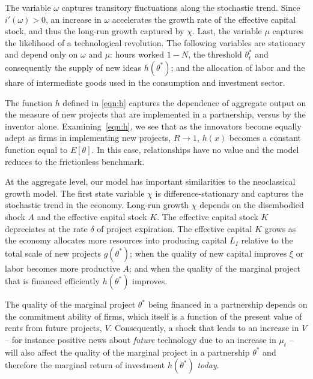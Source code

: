 \documentclass[12pt]{article}
\begin{document}
The variable $\omega$ captures transitory fluctuations along the stochastic trend. Since $i'(\omega)>0$, an increase in $\omega$ accelerates the growth rate of the effective capital stock, and thus the long-run growth captured by $\chi$.
Last, the variable $\mu$ captures the likelihood of a technological revolution. The following variables are stationary and depend only on $\omega$ and $\mu$: hours worked $1-N$, the threshold $\theta_t^*$ and consequently the supply of new ideas $h(\theta^*)$; and the allocation of labor and the share of intermediate goods used in the consumption and investment sector.


The function $h$ defined in \eqref{eqn:h} captures the dependence of aggregate output on the measure of new projects that are implemented in a partnership, versus by the inventor alone. Examining~\eqref{eqn:h}, we see that as the innovators become equally adept as firms in implementing new projects, $R\rightarrow1$, $h(x)$ becomes a constant function equal to $E[\theta]$. In this case, relationships have no value and the model reduces to the frictionless benchmark.


At the aggregate level, our model has important similarities to the neoclassical growth model. The first state variable $\chi$ is difference-stationary and captures the stochastic trend in the economy. Long-run growth $\chi$ depends on the disembodied shock $A$ and the effective capital stock $K$. The effective capital stock $K$ depreciates at the rate $\delta$ of project expiration. The effective capital $K$ grows as the economy allocates more resources into producing capital $L_I$ relative to the total scale of new projects $g(\theta^*)$; when the quality of new capital improves $\xi$ or labor becomes more productive $A$; and when the quality of the marginal project that is financed efficiently $h(\theta^*)$ improves.

The quality of the marginal project $\theta^*$ being financed in a partnership depends on the commitment ability of firms, which itself is a function of the present value of rents from future projects, $V$. Consequently, a shock that leads to an increase in $V$ -- for instance positive news about \emph{future} technology due to an increase in $\mu_t$ -- will also affect the quality of the marginal project in a partnership $\theta^*$ and therefore the marginal return of investment $h(\theta^*)$ \emph{today}.
\end{document}

